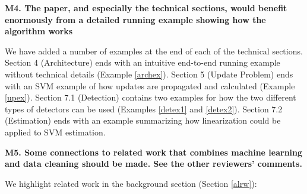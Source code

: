 \vspace{0.5em}

\noindent\textbf{M4. The paper, and especially the technical sections, would benefit enormously from a detailed running example showing how the algorithm works}

We have added a number of examples at the end of each of the technical sections. Section 4 (Architecture) ends with an intuitive end-to-end running example without technical details (Example \ref{archex}).
Section 5 (Update Problem) ends with an SVM example of how updates are propagated and calculated (Example \ref{upex}).
Section 7.1 (Detection) contains two examples for how the two different types of detectors can be used (Examples \ref{detex1} and \ref{detex2}).
Section 7.2 (Estimation) ends with an example summarizing how linearization could be applied to SVM estimation.

\vspace{0.5em}

\noindent\textbf{M5. Some connections to related work that combines machine learning and data cleaning should be made. See the other reviewers' comments.}

We highlight related work in the background section (Section \ref{alrw}):

